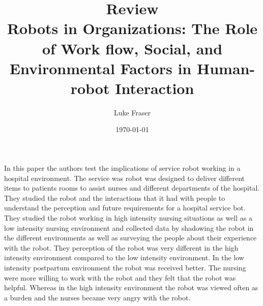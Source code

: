 \documentclass{article}
\begin{document}
\title{{\large Review} \\ Robots in Organizations: The Role of Work flow, Social, and Environmental Factors in Human-robot Interaction}
\author{Luke Fraser}
\date{\today}
\maketitle

\begingroup
\renewcommand{\section}[2]{}


\endgroup

\section*{Summary}
In this paper the authors test the implications of service robot working in a hospital environment. The service was robot was designed to deliver different items to patients rooms to assist nurses and different departments of the hospital. They studied the robot and the interactions that it had with people to understand the perception and future requirements for a hospital service bot. They studied the robot working in high intensity nursing situations as well as a low intensity nursing environment and collected data by shadowing the robot in the different environments as well as surveying the people about their experience with the robot. They perception of the robot was very different in the high intensity environment compared to the low intensity environment. In the low intensity postpartum environment the robot was received better. The nursing were more willing to work with the robot and they felt that the robot was helpful. Whereas in the high intensity environment the robot was viewed often as a burden and the nurses became very angry with the robot.
\section*{Strengths}

\section*{Critique}

\cite{Mutlu:2008:ROR:1349822.1349860}
\end{document}
